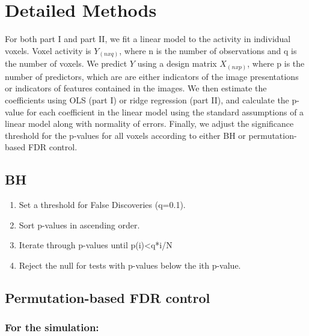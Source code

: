 \documentclass[11pt,notitlepage]{article}
\begin{document}

\newpage

\section*{Detailed Methods}

For both part I and part II, we fit a linear model to the activity in individual voxels. Voxel activity is $ Y_{(nxq)} $, where n is the number of observations and q is the number of voxels. We predict $ Y $ using a design matrix $ X_{(nxp)} $, where p is the number of predictors, which are are either indicators of the image presentations or indicators of features contained in the images. We then estimate the coefficients using OLS (part I) or ridge regression (part II), and calculate the p-value for each coefficient in the linear model using the standard assumptions of a linear model along with normality of errors. Finally, we adjust the significance threshold for the p-values for all voxels according to either BH or permutation-based FDR control. 


\subsection*{BH}


\begin{enumerate}
  \item Set a threshold for False Discoveries (q=0.1).
 \item Sort p-values in ascending order.
 \item Iterate through p-values until p(i)<q*i/N
 \item Reject the null for tests with p-values below the ith p-value.
\end{enumerate}


\subsection*{Permutation-based FDR control}

\subsubsection*{For the simulation:}
\end{document}

